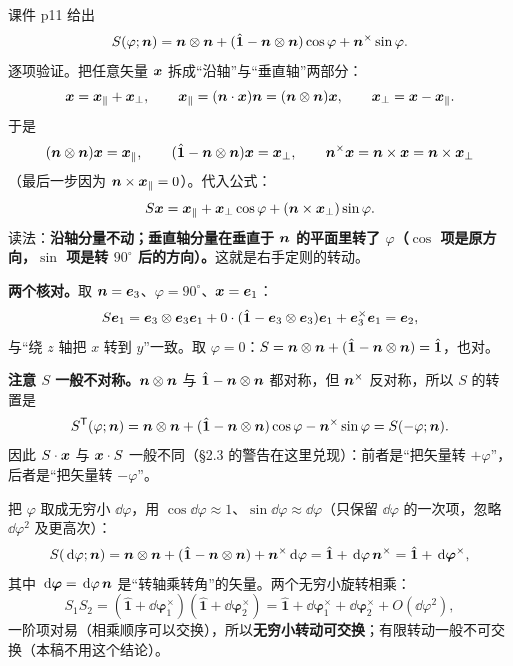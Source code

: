 \documentclass[11pt]{ctexart}
\newcommand{\ten}[1]{\mathbf{#1}}
\newcommand{\unitd}{\hat{\ten{1}}}
\let\origsubhdr\subhdr
\renewcommand{\subhdr}[1]{\par\needspace{3\baselineskip}\origsubhdr{#1}}
\begin{document}
课件 p11 给出
\[
S(\varphi;\vect n)=\vect n\otimes\vect n+(\unitd-\vect n\otimes\vect n)\cos\varphi+\vect n^{\times}\sin\varphi .
\]
逐项验证。把任意矢量 $\boldsymbol{x}$ 拆成“沿轴”与“垂直轴”两部分：
\[
\boldsymbol{x}=\boldsymbol{x}_\parallel+\boldsymbol{x}_\perp,\qquad
\boldsymbol{x}_\parallel=(\boldsymbol{n}\cdot\boldsymbol{x})\boldsymbol{n}=(\boldsymbol{n}\otimes\boldsymbol{n})\boldsymbol{x},\qquad
\boldsymbol{x}_\perp=\boldsymbol{x}-\boldsymbol{x}_\parallel .
\]
于是
\[
(\vect n\otimes\vect n)\vect x=\vect x_\parallel,\qquad
(\unitd-\vect n\otimes\vect n)\vect x=\vect x_\perp,\qquad
\vect n^{\times}\vect x=\vect n\times\vect x=\vect n\times\vect x_\perp
\]
（最后一步因为 $\boldsymbol{n}\times\boldsymbol{x}_\parallel=0$）。代入公式：
\[
S\boldsymbol{x}=\boldsymbol{x}_\parallel+\boldsymbol{x}_\perp\cos\varphi+(\boldsymbol{n}\times\boldsymbol{x}_\perp)\sin\varphi .
\]
读法：\textbf{沿轴分量不动；垂直轴分量在垂直于 $\boldsymbol{n}$ 的平面里转了 $\varphi$（$\cos$ 项是原方向，$\sin$ 项是转 $90^\circ$ 后的方向）。}这就是右手定则的转动。

\textbf{两个核对。}取 $\boldsymbol{n}=\boldsymbol{e}_3$、$\varphi=90^\circ$、$\boldsymbol{x}=\boldsymbol{e}_1$：
\[
S\vect e_1=\vect e_3\otimes\vect e_3\vect e_1+0\cdot(\unitd-\vect e_3\otimes\vect e_3)\vect e_1+\vect e_3^{\times}\vect e_1=\vect e_2,
\]
与“绕 $z$ 轴把 $x$ 转到 $y$”一致。取 $\varphi=0$：$S=\vect n\otimes\vect n+(\unitd-\vect n\otimes\vect n)=\unitd$，也对。

\textbf{注意 $S$ 一般不对称。}$\boldsymbol{n}\otimes\boldsymbol{n}$ 与 $\unitd-\vect n\otimes\vect n$ 都对称，但 $\boldsymbol{n}^{\times}$ 反对称，所以 $S$ 的转置是
\[
S^{\mathsf T}(\varphi;\vect n)=\vect n\otimes\vect n+(\unitd-\vect n\otimes\vect n)\cos\varphi-\vect n^{\times}\sin\varphi=S(-\varphi;\vect n).
\]
因此 $S\cdot\boldsymbol{x}$ 与 $\boldsymbol{x}\cdot S$ 一般不同（§2.3 的警告在这里兑现）：前者是“把矢量转 $+\varphi$”，后者是“把矢量转 $-\varphi$”。


把 $\varphi$ 取成无穷小 $\dd\varphi$，用 $\cos\dd\varphi\approx1$、$\sin\dd\varphi\approx\dd\varphi$（只保留 $\dd\varphi$ 的一次项，忽略 $\dd\varphi^2$ 及更高次）：
\[
S(\dd\varphi;\vect n)=\vect n\otimes\vect n+(\unitd-\vect n\otimes\vect n)+\vect n^{\times}\dd\varphi
=\unitd+\dd\varphi\,\vect n^{\times}=\unitd+\dd{\boldsymbol\varphi}^{\times},
\]
其中 $\,\mathrm{d}{\boldsymbol\varphi}=\,\mathrm{d}\varphi\,\boldsymbol{n}$ 是“转轴乘转角”的矢量。两个无穷小旋转相乘：
\[
S_1S_2=(\unitd+\dd{\boldsymbol\varphi}_1^{\times})(\unitd+\dd{\boldsymbol\varphi}_2^{\times})
=\unitd+\dd{\boldsymbol\varphi}_1^{\times}+\dd{\boldsymbol\varphi}_2^{\times}+O(\dd\varphi^2),
\]
一阶项对易（相乘顺序可以交换），所以\textbf{无穷小转动可交换}；有限转动一般不可交换（本稿不用这个结论）。
\end{document}
